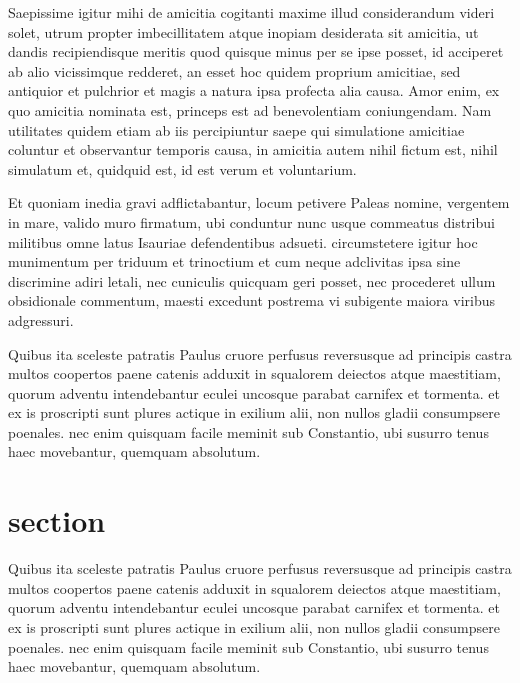
Saepissime igitur mihi de amicitia cogitanti maxime illud considerandum videri
solet, utrum propter imbecillitatem atque inopiam desiderata sit amicitia, ut
dandis recipiendisque meritis quod quisque minus per se ipse posset, id
acciperet ab alio vicissimque redderet, an esset hoc quidem proprium amicitiae,
sed antiquior et pulchrior et magis a natura ipsa profecta alia causa. Amor
enim, ex quo amicitia nominata est, princeps est ad benevolentiam coniungendam.
Nam utilitates quidem etiam ab iis percipiuntur saepe qui simulatione amicitiae
coluntur et observantur temporis causa, in amicitia autem nihil fictum est,
nihil simulatum et, quidquid est, id est verum et voluntarium.

Et quoniam inedia gravi adflictabantur, locum petivere Paleas nomine, vergentem
in mare, valido muro firmatum, ubi conduntur nunc usque commeatus distribui
militibus omne latus Isauriae defendentibus adsueti. circumstetere igitur hoc
munimentum per triduum et trinoctium et cum neque adclivitas ipsa sine
discrimine adiri letali, nec cuniculis quicquam geri posset, nec procederet
ullum obsidionale commentum, maesti excedunt postrema vi subigente maiora
viribus adgressuri.

Quibus ita sceleste patratis Paulus cruore perfusus reversusque ad principis
castra multos coopertos paene catenis adduxit in squalorem deiectos atque
maestitiam, quorum adventu intendebantur eculei uncosque parabat carnifex et
tormenta. et ex is proscripti sunt plures actique in exilium alii, non nullos
gladii consumpsere poenales. nec enim quisquam facile meminit sub Constantio,
ubi susurro tenus haec movebantur, quemquam absolutum.

\section{section}

Quibus ita sceleste patratis Paulus cruore perfusus reversusque ad principis
castra multos coopertos paene catenis adduxit in squalorem deiectos atque
maestitiam, quorum adventu intendebantur eculei uncosque parabat carnifex et
tormenta. et ex is proscripti sunt plures actique in exilium alii, non nullos
gladii consumpsere poenales. nec enim quisquam facile meminit sub Constantio,
ubi susurro tenus haec movebantur, quemquam absolutum.

